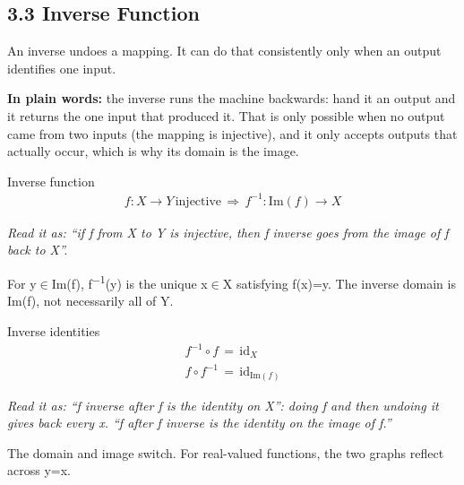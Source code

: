 \documentclass[11pt]{article}
\begin{document}
\begin{keepsection}
\section{3.3 Inverse Function}

An inverse undoes a mapping. It can do that consistently only when an output identifies one input.

\begin{plainbox}\textbf{In plain words:} the inverse runs the machine backwards: hand it an output and it returns the one input that produced it. That is only possible when no output came from two inputs (the mapping is injective), and it only accepts outputs that actually occur, which is why its domain is the image.\end{plainbox}

\begin{equationcard}{Inverse function}
\[ \begin{gathered} {f}:{X}\to {Y}\, \text{injective}\, \Rightarrow \, {f}^{-1}:\text{Im}({f})\to {X} \end{gathered} \]
{\small \emph{Read it as: “if f from X to Y is injective, then f inverse goes from the image of f back to X”.}\par For y\ensuremath{\in}Im(f), f\textsuperscript{\ensuremath{-}1}(y) is the unique x\ensuremath{\in}X satisfying f(x)=y. The inverse domain is Im(f), not necessarily all of Y.}
\end{equationcard}

\begin{equationcard}{Inverse identities}
\[ \begin{gathered} {f}^{-1}\circ {f}\, =\, \text{id}_{{X}} \\ {f}\circ {f}^{-1}\, =\, \text{id}_{\text{Im}({f})} \end{gathered} \]
{\small \emph{Read it as: “f inverse after f is the identity on X”: doing f and then undoing it gives back every x. “f after f inverse is the identity on the image of f.”}\par The domain and image switch. For real-valued functions, the two graphs reflect across y=x.}
\end{equationcard}


\end{keepsection}
\end{document}

